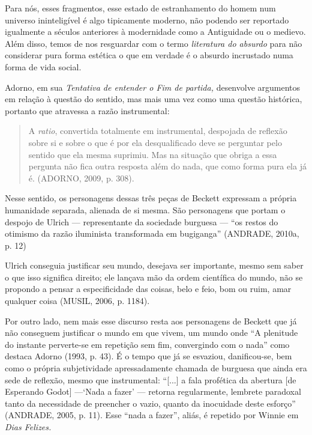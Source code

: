 Para nós, esses fragmentos, esse estado de estranhamento do homem num
universo ininteligível é algo tipicamente moderno, não podendo ser
reportado igualmente a séculos anteriores à modernidade como a
Antiguidade ou o medievo. Além disso, temos de nos resguardar com o
termo \emph{literatura do absurdo} para não considerar pura forma
estética o que em verdade é o absurdo incrustado numa forma de vida
social.

Adorno, em sua \emph{Tentativa de entender o Fim de partida,} desenvolve
argumentos em relação à questão do sentido, mas mais uma vez como uma
questão histórica, portanto que atravessa a razão instrumental:

\begin{quote}
A \emph{ratio}, convertida totalmente em instrumental, despojada de
reflexão sobre si e sobre o que é por ela desqualificado deve se
perguntar pelo sentido que ela mesma suprimiu. Mas na situação que
obriga a essa pergunta não fica outra resposta além do nada, que como
forma pura ela já é. (ADORNO, 2009, p. 308).
\end{quote}

Nesse sentido, os personagens dessas três peças de Beckett expressam a
própria humanidade separada, alienada de si mesma. São personagens que
portam o despojo de Ulrich --- representante da sociedade burguesa ---
``os restos do otimismo da razão iluminista transformada em bugiganga''
(ANDRADE, 2010a, p. 12)

Ulrich conseguia justificar seu mundo, desejava ser importante, mesmo
sem saber o que isso significa direito; ele lançava mão da ordem
científica do mundo, não se propondo a pensar a especificidade das
coisas, belo e feio, bom ou ruim, amar qualquer coisa (MUSIL, 2006, p.
1184).

Por outro lado, nem mais esse discurso resta aos personagens de Beckett
que já não conseguem justificar o mundo em que vivem, um mundo onde ``A
plenitude do instante perverte-se em repetição sem fim, convergindo com
o nada'' como destaca Adorno (1993, p. 43). É o tempo que já se
esvaziou, danificou-se, bem como o própria subjetividade apressadamente
chamada de burguesa que ainda era sede de reflexão, mesmo que
instrumental: ``{[}...{]} a fala profética da abertura {[}de Esperando
Godot{]} ---`Nada a fazer' --- retorna regularmente, lembrete paradoxal
tanto da necessidade de preencher o vazio, quanto da inocuidade deste
esforço'' (ANDRADE, 2005, p. 11). Esse ``nada a fazer'', aliás, é
repetido por Winnie em \emph{Dias Felizes.}


